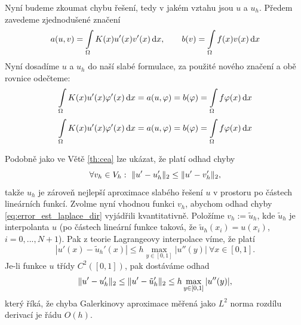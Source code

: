Nyní budeme zkoumat chybu řešení, tedy v jakém vztahu jsou $u$ a $u_h$.
Předem zavedeme zjednodušené značení
\[
a(u,v) = \int\limits_\Omega K(x) u'(x) v'(x) \,{\rm d} x, \qquad b(v) = \int\limits_\Omega f(x) v(x) \,{\rm d} x
\]
Nyní dosadíme $u$ a $u_h$ do naší slabé formulace, za použité nového značení a obě rovnice odečteme:
\[
\int\limits_\Omega K(x) u'(x) \varphi'(x) \,{\rm d} x = a(u,\varphi) = b(\varphi) = \int\limits_\Omega f \varphi(x) \,{\rm d} x
\]
\[
\int\limits_\Omega K(x) u'(x) \varphi'(x) \,{\rm d} x = a(u,\varphi) = b(\varphi) = \int\limits_\Omega f \varphi(x) \,{\rm d} x
\]



Podobně jako ve Větě \ref{th:cea} lze ukázat, že platí odhad chyby
\begin{equation}\label{eq:error_est_laplace_dir}
\forall v_h\in V_h:~\|u'-u_h'\|_2 \le \|u'-v_h'\|_2,
\end{equation}
takže $u_h$ je zároveň nejlepší aproximace slabého řešení $u$ v prostoru po částech lineárních funkcí.
Zvolme nyní vhodnou funkci $v_h$, abychom odhad chyby \eqref{eq:error_est_laplace_dir} vyjádřili kvantitativně.
Položíme $v_h:=\tilde u_h$, kde $\tilde u_h$ je interpolanta $u$ (po částech lineární funkce taková, že $\tilde u_h(x_i)=u(x_i)$, $i=0,...,N+1$).
Pak z teorie Lagrangeovy interpolace víme, že platí
\[ |u'(x)-\tilde u_h'(x)|\le h\max_{y\in[0,1]}|u''(y)| ~\forall x\in[0,1]. \]
Je-li funkce $u$ třídy $C^2([0,1])$, pak dostáváme odhad
\[ \|u'-u_h'\|_2 \le \|u'-\tilde u_h'\|_2 \le h\max_{y\in[0,1]}|u''(y)|, \]
který říká, že chyba Galerkinovy aproximace měřená jako $L^2$ norma rozdílu derivací je řádu $O(h)$.
